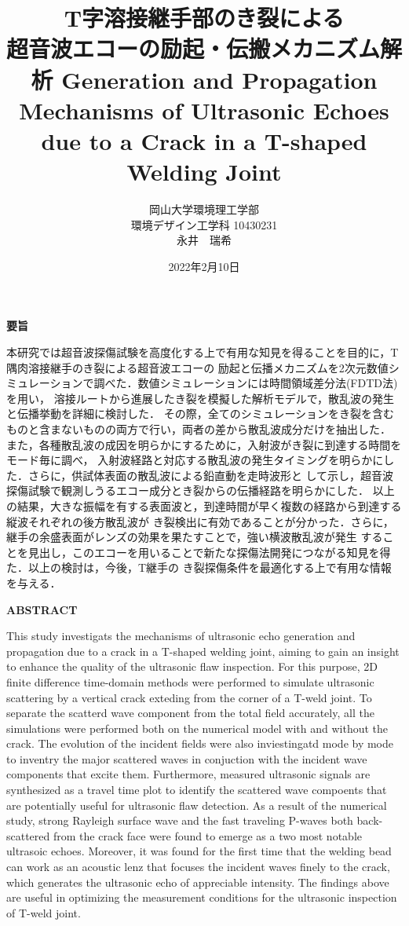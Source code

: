 ﻿\documentclass[11pt,a4j]{mybook2}
\title{
\vspace{20mm}
T字溶接継手部のき裂による\\
超音波エコーの励起・伝搬メカニズム解析
\vspace{5mm}
Generation and Propagation Mechanisms of Ultrasonic Echoes \\
due to a Crack in a T-shaped Welding Joint
\vspace{60mm}
}
\date{2022年2月10日}
\author{
	\vspace{40mm}
岡山大学環境理工学部\\
環境デザイン工学科 10430231\\
	永井　瑞希
}
\begin{document}
\maketitle
\begin{center}
\begin{minipage}{15cm}
\begin{center}
	{\bf 要旨}
\end{center}
本研究では超音波探傷試験を高度化する上で有用な知見を得ることを目的に，T隅肉溶接継手のき裂による超音波エコーの
励起と伝播メカニズムを2次元数値シミュレーションで調べた．数値シミュレーションには時間領域差分法(FDTD法)を用い，
溶接ルートから進展したき裂を模擬した解析モデルで，散乱波の発生と伝播挙動を詳細に検討した．
その際，全てのシミュレーションをき裂を含むものと含まないものの両方で行い，両者の差から散乱波成分だけを抽出した．
また，各種散乱波の成因を明らかにするために，入射波がき裂に到達する時間をモード毎に調べ，
入射波経路と対応する散乱波の発生タイミングを明らかにした．さらに，供試体表面の散乱波による鉛直動を走時波形と
して示し，超音波探傷試験で観測しうるエコー成分とき裂からの伝播経路を明らかにした．
以上の結果，大きな振幅を有する表面波と，到達時間が早く複数の経路から到達する縦波それぞれの後方散乱波が
き裂検出に有効であることが分かった．さらに，継手の余盛表面がレンズの効果を果たすことで，強い横波散乱波が発生
することを見出し，このエコーを用いることで新たな探傷法開発につながる知見を得た．以上の検討は，今後，T継手の
き裂探傷条件を最適化する上で有用な情報を与える．
	\vspace{15mm}
\begin{center}
	{\bf ABSTRACT}
\end{center}
This study investigats the mechanisms of ultrasonic echo generation and propagation due to 
a crack in a T-shaped welding joint, aiming to gain an insight to enhance the quality of the 
ultrasonic flaw inspection.
For this purpose, 2D finite difference time-domain methods were performed to simulate ultrasonic 
scattering by a vertical crack exteding from the corner of a T-weld joint. 
To separate the scatterd wave component from the total field accurately, all the simulations were 
performed both on the numerical model with and without the crack. The evolution of the incident 
fields were also inviestingatd mode by mode to inventry the major scattered waves in conjuction 
with the incident wave components that excite them. Furthermore, measured ultrasonic signals are 
synthesized as a travel time plot to identify the scattered wave compoents that are potentially 
useful for ultrasonic flaw detection. As a result of the numerical study, strong Rayleigh surface 
wave and the fast traveling P-waves both back-scattered from the crack face were found to 
 emerge as a two most notable ultrasoic echoes. Moreover, it was found for the first time that 
the welding bead can work as an acoustic lenz that focuses the incident waves finely to the crack, 
which  generates the ultrasonic echo of appreciable intensity.
The findings above are useful in optimizing the measurement conditions for the ultrasonic 
inspection of T-weld joint.
\end{minipage}
\end{center}
\tableofcontents
\frontmatter
\mainmatter
\end{document}
